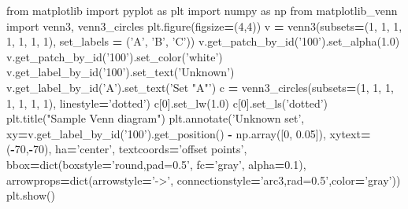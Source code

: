 \documentclass[]{book}
\newenvironment{Shaded}{\begin{snugshade}}{\end{snugshade}}
\newcommand{\DecValTok}[1]{\textcolor[rgb]{0.00,0.00,0.81}{#1}}
\newcommand{\FloatTok}[1]{\textcolor[rgb]{0.00,0.00,0.81}{#1}}
\newcommand{\StringTok}[1]{\textcolor[rgb]{0.31,0.60,0.02}{#1}}
\newcommand{\ImportTok}[1]{#1}
\newcommand{\OperatorTok}[1]{\textcolor[rgb]{0.81,0.36,0.00}{\textbf{#1}}}
\newcommand{\BuiltInTok}[1]{#1}
\newcommand{\NormalTok}[1]{#1}
\begin{document}
\begin{Shaded}
\begin{Highlighting}[]
\ImportTok{from}\NormalTok{ matplotlib }\ImportTok{import}\NormalTok{ pyplot }\ImportTok{as}\NormalTok{ plt}
\ImportTok{import}\NormalTok{ numpy }\ImportTok{as}\NormalTok{ np}
\ImportTok{from}\NormalTok{ matplotlib_venn }\ImportTok{import}\NormalTok{ venn3, venn3_circles}
\NormalTok{plt.figure(figsize}\OperatorTok{=}\NormalTok{(}\DecValTok{4}\NormalTok{,}\DecValTok{4}\NormalTok{))}
\NormalTok{v }\OperatorTok{=}\NormalTok{ venn3(subsets}\OperatorTok{=}\NormalTok{(}\DecValTok{1}\NormalTok{, }\DecValTok{1}\NormalTok{, }\DecValTok{1}\NormalTok{, }\DecValTok{1}\NormalTok{, }\DecValTok{1}\NormalTok{, }\DecValTok{1}\NormalTok{, }\DecValTok{1}\NormalTok{), set_labels }\OperatorTok{=}\NormalTok{ (}\StringTok{'A'}\NormalTok{, }\StringTok{'B'}\NormalTok{, }\StringTok{'C'}\NormalTok{))}
\NormalTok{v.get_patch_by_id(}\StringTok{'100'}\NormalTok{).set_alpha(}\FloatTok{1.0}\NormalTok{)}
\NormalTok{v.get_patch_by_id(}\StringTok{'100'}\NormalTok{).set_color(}\StringTok{'white'}\NormalTok{)}
\NormalTok{v.get_label_by_id(}\StringTok{'100'}\NormalTok{).set_text(}\StringTok{'Unknown'}\NormalTok{)}
\NormalTok{v.get_label_by_id(}\StringTok{'A'}\NormalTok{).set_text(}\StringTok{'Set "A"'}\NormalTok{)}
\NormalTok{c }\OperatorTok{=}\NormalTok{ venn3_circles(subsets}\OperatorTok{=}\NormalTok{(}\DecValTok{1}\NormalTok{, }\DecValTok{1}\NormalTok{, }\DecValTok{1}\NormalTok{, }\DecValTok{1}\NormalTok{, }\DecValTok{1}\NormalTok{, }\DecValTok{1}\NormalTok{, }\DecValTok{1}\NormalTok{), linestyle}\OperatorTok{=}\StringTok{'dotted'}\NormalTok{)}
\NormalTok{c[}\DecValTok{0}\NormalTok{].set_lw(}\FloatTok{1.0}\NormalTok{)}
\NormalTok{c[}\DecValTok{0}\NormalTok{].set_ls(}\StringTok{'dotted'}\NormalTok{)}
\NormalTok{plt.title(}\StringTok{"Sample Venn diagram"}\NormalTok{)}
\NormalTok{plt.annotate(}\StringTok{'Unknown set'}\NormalTok{, xy}\OperatorTok{=}\NormalTok{v.get_label_by_id(}\StringTok{'100'}\NormalTok{).get_position() }\OperatorTok{-}\NormalTok{ np.array([}\DecValTok{0}\NormalTok{, }\FloatTok{0.05}\NormalTok{]), xytext}\OperatorTok{=}\NormalTok{(}\OperatorTok{-}\DecValTok{70}\NormalTok{,}\OperatorTok{-}\DecValTok{70}\NormalTok{),}
\NormalTok{             ha}\OperatorTok{=}\StringTok{'center'}\NormalTok{, textcoords}\OperatorTok{=}\StringTok{'offset points'}\NormalTok{, bbox}\OperatorTok{=}\BuiltInTok{dict}\NormalTok{(boxstyle}\OperatorTok{=}\StringTok{'round,pad=0.5'}\NormalTok{, fc}\OperatorTok{=}\StringTok{'gray'}\NormalTok{, alpha}\OperatorTok{=}\FloatTok{0.1}\NormalTok{),}
\NormalTok{                          arrowprops}\OperatorTok{=}\BuiltInTok{dict}\NormalTok{(arrowstyle}\OperatorTok{=}\StringTok{'->'}\NormalTok{, connectionstyle}\OperatorTok{=}\StringTok{'arc3,rad=0.5'}\NormalTok{,color}\OperatorTok{=}\StringTok{'gray'}\NormalTok{))}
\NormalTok{                          plt.show()}
\end{Highlighting}
\end{Shaded}
\end{document}
